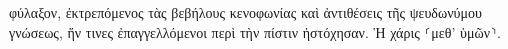 \documentclass{openreader}
\begin{document}
φύλαξον, ἐκτρεπόμενος τὰς βεβήλους κενοφωνίας καὶ ἀντιθέσεις τῆς ψευδωνύμου γνώσεως, ἥν τινες ἐπαγγελλόμενοι περὶ τὴν πίστιν ἠστόχησαν. Ἡ χάρις ⸂μεθ’ ὑμῶν⸃. 
\end{document}
